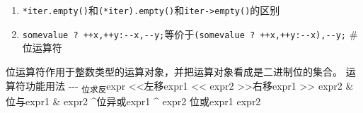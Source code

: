 \documentclass[
  a4paper,
  oneside,tablecaptionabove
]{scrbook}
\providecommand{\tightlist}{%
  \setlength{\itemsep}{0pt}\setlength{\parskip}{0pt}}
\begin{document}
\begin{enumerate}
\def\labelenumi{\arabic{enumi}.}
\tightlist
\item
  \lstinline!*iter.empty()!和\lstinline!(*iter).empty()!和\lstinline!iter->empty()!的区别\\
\item
  \lstinline!somevalue ? ++x,++y:--x,--y;!等价于\lstinline!(somevalue ? ++x,++y:--x),--y;!
  \# 位运算符
\end{enumerate}

位运算符作用于整数类型的运算对象，并把运算对象看成是二进制位的集合。
\textbar{}运算符\textbar{}功能\textbar{}用法\textbar{}
\textbar{}-\textbar{}-\textbar{}-\textbar{}
\textbar{}\textsubscript{\textbar{}位求反\textbar{}}expr\textbar{}
\textbar{}\textless{}\textless{}\textbar{}左移\textbar{}expr1
\textless{}\textless{} expr2\textbar{}
\textbar{}\textgreater{}\textgreater{}\textbar{}右移\textbar{}expr1
\textgreater{}\textgreater{} expr2\textbar{}
\textbar{}\&\textbar{}位与\textbar{}expr1 \& expr2\textbar{}
\textbar{}\^{}\textbar{}位异或\textbar{}expr1 \^{} expr2\textbar{}
\textbar{}\textbar{}\textbar{}位或\textbar{}expr1 \textbar{}
expr2\textbar{}
\end{document}
